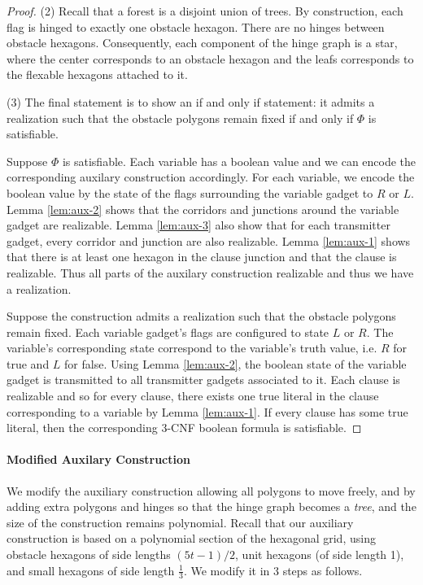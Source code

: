 \begin{proof}
\noindent (2) Recall that a forest is a disjoint union of trees. 
By construction, each flag is hinged to exactly one obstacle hexagon.  
There are no hinges between obstacle hexagons.
Consequently, each component of the hinge graph is a star, where the center corresponds to an obstacle hexagon and the leafs corresponds to the flexable hexagons attached to it.

\noindent (3) The final statement is to show an if and only if statement: it admits a realization such that the obstacle polygons remain fixed if and only if $\Phi$ is satisfiable.

Suppose $\Phi$ is satisfiable.  %
Each variable has a boolean value and we can encode the corresponding auxilary construction accordingly.  
For each variable, we encode the boolean value by the state of the flags surrounding the variable gadget to $R$ or $L$.  
Lemma \ref{lem:aux-2} shows that the corridors and junctions around the variable gadget are realizable.
Lemma \ref{lem:aux-3} also show that for each transmitter gadget, every corridor and junction are also realizable. 
Lemma \ref{lem:aux-1} shows that there is at least one hexagon in the clause junction and that the clause is realizable.
Thus all parts of the auxilary construction realizable and thus we have a realization.

Suppose the construction admits a realization such that the obstacle polygons remain fixed.
Each variable gadget's flags are configured to state $L$ or $R$. 
The variable's corresponding state correspond to the variable's truth value, i.e. $R$ for true and $L$ for false.
Using Lemma \ref{lem:aux-2}, the boolean state of the variable gadget is transmitted to all transmitter gadgets associated to it.
Each clause is realizable and so for every clause, there exists one true literal in the clause corresponding to a variable by Lemma \ref{lem:aux-1}. 
If every clause has some true literal, then the corresponding 3-CNF boolean formula is satisfiable.
\end{proof}
\paragraph{Modified Auxilary Construction}
We modify the auxiliary construction allowing all polygons to move freely, and by adding extra polygons and hinges so that the hinge graph becomes a \emph{tree}, and the size of the construction remains polynomial. 
Recall that our auxiliary construction is based on a polynomial section of the hexagonal grid, using obstacle hexagons of side lengths $(5t-1)/2$, unit hexagons (of side length 1), and small hexagons of side length $\frac{1}{3}$. 
We modify it in 3 steps as follows.

